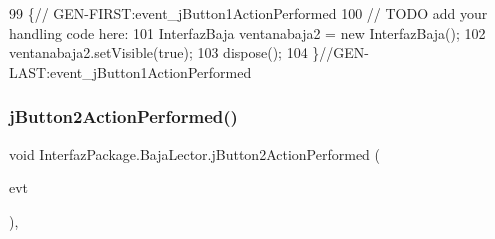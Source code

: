 \begin{DoxyCode}
99                                                                          \{\textcolor{comment}{//
      GEN-FIRST:event\_jButton1ActionPerformed}
100         \textcolor{comment}{// TODO add your handling code here:}
101         InterfazBaja ventanabaja2 = \textcolor{keyword}{new} InterfazBaja();
102         ventanabaja2.setVisible(\textcolor{keyword}{true});
103         dispose();
104     \}\textcolor{comment}{//GEN-LAST:event\_jButton1ActionPerformed}
\end{DoxyCode}
\mbox{\label{class_interfaz_package_1_1_baja_lector_a68ce955ddab00f21a3fe2f7aa43f098d}} 
\subsubsection{\texorpdfstring{j\+Button2\+Action\+Performed()}{jButton2ActionPerformed()}}
{\footnotesize\ttfamily void Interfaz\+Package.\+Baja\+Lector.\+j\+Button2\+Action\+Performed (\begin{DoxyParamCaption}\item[{java.\+awt.\+event.\+Action\+Event}]{evt }\end{DoxyParamCaption})\hspace{0.3cm}{\ttfamily [inline]}, {\ttfamily [private]}}


